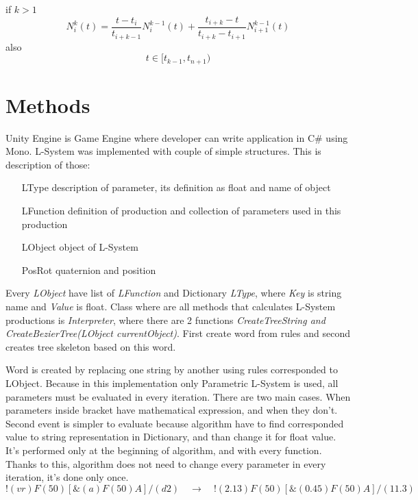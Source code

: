 \documentclass[b5paper,twoside,11pt]{article}
\begin{document}
  if $k > 1$
   \begin{equation}
  N_{i}^{k}(t)=\frac{t-t_i}{t_{i+k-1}} N_{i}^{k-1}(t) + \frac{t_{i+k} - t}{t_{i+k} - t_{i+1}} N_{i+1}^{k-1}(t)
 \end{equation}
 also
    \begin{equation}
    t\in[t_{k-1},t_{n+1})	
 \end{equation}
\iffalse
\section{Methods}
Unity Engine is Game Engine where developer can write application in C\# using Mono. L-System was implemented with couple of simple structures. This is description of those:
\begin{itemize}[labelindent=5.5em,labelsep=1cm,leftmargin=*]
\item [LType] description of parameter, its definition as float and name of object
\item [LFunction] definition of production and collection of parameters used in this production
\item [LObject] object of L-System
\item [PosRot] quaternion and position
\end{itemize}
Every \textit{LObject} have list of \textit{LFunction} and Dictionary \textit{LType}, where \textit{Key} is string name and \textit{Value} is float.
Class where are all methods that calculates L-System productions is \textit{Interpreter}, where there are 2  functions \textit{CreateTreeString and} \textit{CreateBezierTree(LObject currentObject)}. First create word from rules and second creates tree skeleton based on this word. \par
Word is created by replacing one string by another using rules corresponded to LObject. Because in this implementation only Parametric L-System is used, all parameters must be evaluated in every iteration. There are two main cases. When parameters inside bracket have mathematical expression, and when they don't. Second event is simpler to evaluate because algorithm have to find corresponded value to string representation in Dictionary, and than change it for float value. It's performed only at the beginning of algorithm, and with every function. Thanks to this, algorithm does not need to change every parameter in every iteration, it's done only once.
\begin{equation} 
!(vr)F(50)[ \&(a)F(50)A]/(d2) \quad\longrightarrow\quad !(2.13)F(50)[ \&(0.45)F(50)A]/(11.3)
 \end{equation}
\end{document}

